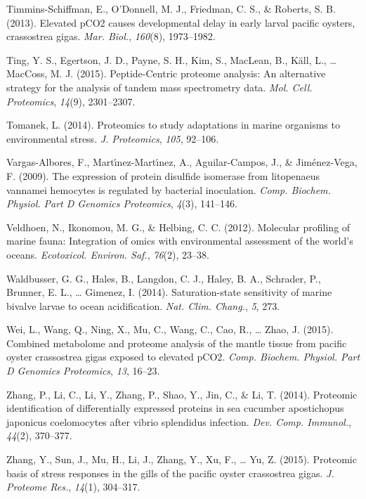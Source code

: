 \documentclass [11pt, proquest] {uwthesis}[2015/03/03]
\newlength{\cslhangindent}
\newenvironment{CSLReferences}%
{\setlength{\parindent}{0pt}%
\everypar{\setlength{\hangindent}{\cslhangindent}}\ignorespaces}%
{\par}
\begin{document}
\begin{CSLReferences}{1}{0}
\leavevmode\hypertarget{ref-Timmins-Schiffman2013}{}%
Timmins-Schiffman, E., O'Donnell, M. J., Friedman, C. S., \& Roberts, S. B. (2013). Elevated {pCO2} causes developmental delay in early larval pacific oysters, crassostrea gigas. \emph{Mar. Biol.}, \emph{160}(8), 1973--1982.

\leavevmode\hypertarget{ref-Ting2015}{}%
Ting, Y. S., Egertson, J. D., Payne, S. H., Kim, S., MacLean, B., Käll, L., \ldots{} MacCoss, M. J. (2015). {Peptide-Centric} proteome analysis: An alternative strategy for the analysis of tandem mass spectrometry data. \emph{Mol. Cell. Proteomics}, \emph{14}(9), 2301--2307.

\leavevmode\hypertarget{ref-Tomanek2014}{}%
Tomanek, L. (2014). Proteomics to study adaptations in marine organisms to environmental stress. \emph{J. Proteomics}, \emph{105}, 92--106.

\leavevmode\hypertarget{ref-Vargas-Albores2009}{}%
Vargas-Albores, F., Martı́nez-Martı́nez, A., Aguilar-Campos, J., \& Jiménez-Vega, F. (2009). The expression of protein disulfide isomerase from litopenaeus vannamei hemocytes is regulated by bacterial inoculation. \emph{Comp. Biochem. Physiol. Part D Genomics Proteomics}, \emph{4}(3), 141--146.

\leavevmode\hypertarget{ref-Veldhoen2012}{}%
Veldhoen, N., Ikonomou, M. G., \& Helbing, C. C. (2012). Molecular profiling of marine fauna: Integration of omics with environmental assessment of the world's oceans. \emph{Ecotoxicol. Environ. Saf.}, \emph{76}(2), 23--38.

\leavevmode\hypertarget{ref-Waldbusser2014}{}%
Waldbusser, G. G., Hales, B., Langdon, C. J., Haley, B. A., Schrader, P., Brunner, E. L., \ldots{} Gimenez, I. (2014). Saturation-state sensitivity of marine bivalve larvae to ocean acidification. \emph{Nat. Clim. Chang.}, \emph{5}, 273.

\leavevmode\hypertarget{ref-Wei2015}{}%
Wei, L., Wang, Q., Ning, X., Mu, C., Wang, C., Cao, R., \ldots{} Zhao, J. (2015). Combined metabolome and proteome analysis of the mantle tissue from pacific oyster crassostrea gigas exposed to elevated {pCO2}. \emph{Comp. Biochem. Physiol. Part D Genomics Proteomics}, \emph{13}, 16--23.

\leavevmode\hypertarget{ref-Zhang2014}{}%
Zhang, P., Li, C., Li, Y., Zhang, P., Shao, Y., Jin, C., \& Li, T. (2014). Proteomic identification of differentially expressed proteins in sea cucumber apostichopus japonicus coelomocytes after vibrio splendidus infection. \emph{Dev. Comp. Immunol.}, \emph{44}(2), 370--377.

\leavevmode\hypertarget{ref-Zhang2015}{}%
Zhang, Y., Sun, J., Mu, H., Li, J., Zhang, Y., Xu, F., \ldots{} Yu, Z. (2015). Proteomic basis of stress responses in the gills of the pacific oyster crassostrea gigas. \emph{J. Proteome Res.}, \emph{14}(1), 304--317.

\end{CSLReferences}
\end{document}
